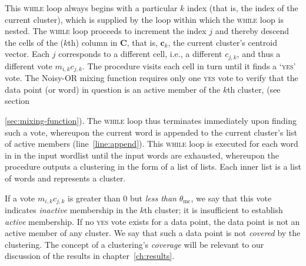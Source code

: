  This \textsc{while} loop always begins with a particular $k$ index (that is, the index of the current cluster), which is supplied 
 by the loop within which the \textsc{while} loop is nested.
 The \textsc{while} loop proceeds to increment the index $j$ and thereby descend the cells of the ($k$th) 
 column in $\mathbf{C}$, that is,  $\mathbf{c}_k$, the current cluster's centroid vector. 
 Each  $j$ corresponds 
 to a different cell, i.e., a different  $c_{j,k}$, and thus a different vote 
 $m_{i,k}c_{j,k}$. 
The procedure visits each cell in turn until it finds a `\textsc{yes}' vote.
The Noisy-OR mixing function requires only one \textsc{yes} vote to verify that the data 
point (or word) in question is an active member of the $k$th cluster,
(see section~{\ref{sec:mixing-function}). The \textsc{while} loop thus terminates immediately upon finding 
 such a vote, whereupon
the current word is appended to the current cluster's list of active members (line~\ref{line:append}). 
This \textsc{while} loop is executed for each word in in the input wordlist until the input words are exhausted, whereupon the procedure outputs a clustering in the form of a list of lists. Each inner list is a list of words and represents a cluster. 
 
If a vote $m_{i,k}c_{j,k}$ is greater than $0$ but \emph{less than} $\theta_{\text{mc}}$,
we say that this vote indicates \emph{inactive} membership in the $k$th cluster; it is insufficient to
establish \emph{active} membership. If no \textsc{yes} vote exists for a data point, the data point is not an active member of 
any cluster. We say that such a data point is not \emph{covered} by the clustering.  
The concept of a clustering's \emph{coverage} will be relevant to our discussion of the results in chapter~\ref{ch:results}.
 


}
